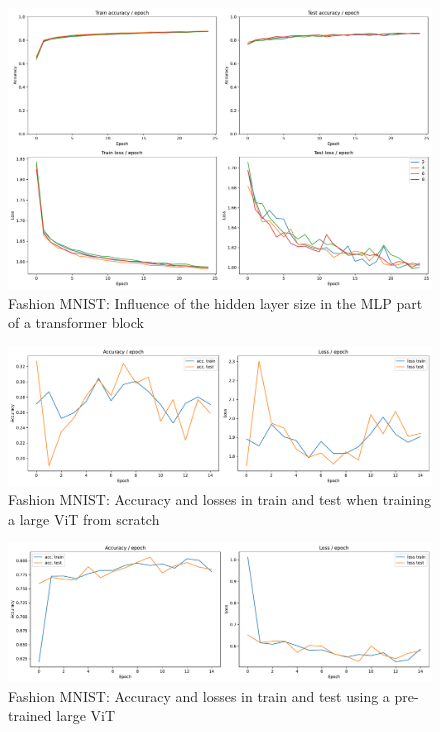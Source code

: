 \begin{figure}[H]
    \centering
    \includegraphics*[width=\textwidth]{figs/Transformers/fashion-MNIST/mlp_ratio_influence_25.pdf}
    \caption{Fashion MNIST: Influence of the hidden layer size in the MLP part of a transformer block}
    \label{fig:fashion:mlp_ratio_influence}
\end{figure}

\begin{figure}[H]
    \centering
    \includegraphics*[width=\textwidth]{figs/Transformers/fashion-MNIST/stats_vit_15.pdf}
    \caption{Fashion MNIST: Accuracy and losses in train and test when training a large ViT from scratch}
    \label{fig:fashion:stats_vit}
\end{figure}

\begin{figure}[H]
    \centering
    \includegraphics*[width=\textwidth]{figs/Transformers/fashion-MNIST/stats_vit_pretrained_15.pdf}
    \caption{Fashion MNIST: Accuracy and losses in train and test using a pre-trained large ViT}
    \label{fig:fashion:stats_vit_pretrained}
\end{figure}